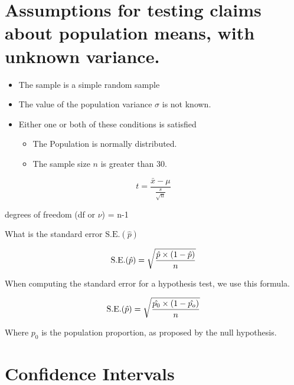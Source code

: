 \section{Assumptions for testing claims about population means, with unknown variance.}
{
\begin{itemize}
\item The sample is a simple random sample
\item The value of the population variance $\sigma$ is not known.
\item Either one or both of these conditions is satisfied
\begin{itemize}
\item The Population is normally distributed.
\item The sample size $n$ is greater than 30.
\end{itemize}
\end{itemize}
}

{
\[ t = \frac{\bar{x} - \mu}{\frac{s}{\sqrt{n}}} \]

degrees of freedom (df or $\nu$) = n-1
}












{
What is the standard error $\mbox{S.E.}(\hat{p})$ 

\[ \mbox{S.E.}(\hat{p}) = \sqrt{{\hat{p} \times (1- \hat{p}) \over n}} \]

When computing the standard error for a hypothesis test, we use this formula.

\[ \mbox{S.E.}(\hat{p}) = \sqrt{{\hat{p_0} \times (1- \hat{p_o}) \over n}} \]

Where $p_0$ is the population proportion, as proposed by the null hypothesis.
}









\section{Confidence Intervals}

